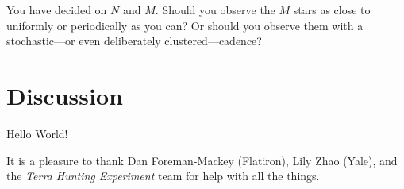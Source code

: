 \documentclass[modern]{aastex63}
\newcommand{\project}[1]{\textsl{#1}}
\begin{document}
You have decided on $N$ and $M$. Should you observe the $M$ stars as close
to uniformly or periodically as you can? Or should you observe them with
a stochastic---or even deliberately clustered---cadence?

\section{Discussion}

Hello World!

\acknowledgments

It is a pleasure to thank
  Dan Foreman-Mackey (Flatiron),
  Lily Zhao (Yale),
  and
  the \project{Terra Hunting Experiment} team
for help with all the things.

\software{
}



\end{document}
